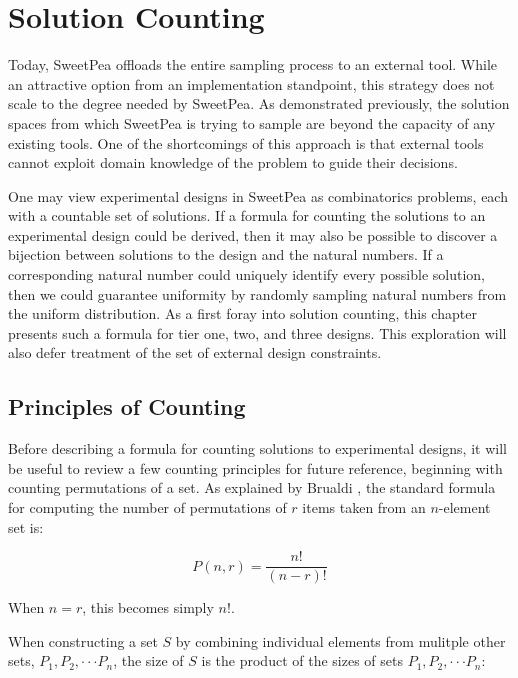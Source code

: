
\chapter{Solution Counting}

Today, SweetPea offloads the entire sampling process to an external tool. While an attractive option from an implementation standpoint, this strategy does not scale to the degree needed by SweetPea. As demonstrated previously, the solution spaces from which SweetPea is trying to sample are beyond the capacity of any existing tools. One of the shortcomings of this approach is that external tools cannot exploit domain knowledge of the problem to guide their decisions.

One may view experimental designs in SweetPea as combinatorics problems, each with a countable set of solutions. If a formula for counting the solutions to an experimental design could be derived, then it may also be possible to discover a bijection between solutions to the design and the natural numbers. If a corresponding natural number could uniquely identify every possible solution, then we could guarantee uniformity by randomly sampling natural numbers from the uniform distribution. As a first foray into solution counting, this chapter presents such a formula for tier one, two, and three designs. This exploration will also defer treatment of the set of external design constraints.


\section{Principles of Counting}

Before describing a formula for counting solutions to experimental designs, it will be useful to review a few counting principles for future reference, beginning with counting permutations of a set. As explained by Brualdi \cite{brualdi_introductory_2010}, the standard formula for computing the number of permutations of $r$ items taken from an $n$-element set is:

\[
P(n,r) = \frac{n!}{(n-r)!}
\]

When $n =  r$, this becomes simply $n!$.



When constructing a set $S$ by combining individual elements from mulitple other sets, $P_1, P_2, \cdot\cdot\cdot P_n$, the size of $S$ is the product of the sizes of sets $P_1, P_2, \cdot\cdot\cdot P_n$:

